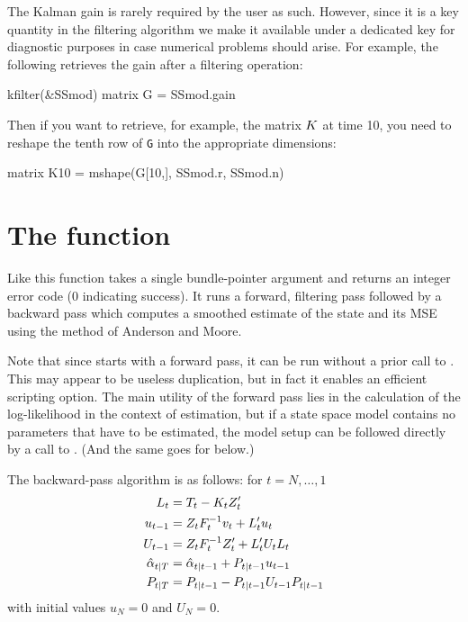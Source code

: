 The Kalman gain is rarely required by the user as such. However, since
it is a key quantity in the filtering algorithm we make it available
under a dedicated key for diagnostic purposes in case numerical
problems should arise. For example, the following retrieves the gain
after a filtering operation:
%
\begin{code}
kfilter(&SSmod)
matrix G = SSmod.gain
\end{code}

Then if you want to retrieve, for example, the matrix $K$ at time
10, you need to reshape the tenth row of \texttt{G} into the
appropriate dimensions:
\begin{code}
matrix K10 = mshape(G[10,], SSmod.r, SSmod.n)
\end{code}

\section{The  function}
\label{sec:ksmooth}

Like  this function takes a single bundle-pointer
argument and returns an integer error code (0 indicating success).  It
runs a forward, filtering pass followed by a backward pass which
computes a smoothed estimate of the state and its MSE using the method
of Anderson and Moore.

Note that since  starts with a forward pass, it can be
run without a prior call to . This may appear to be
useless duplication, but in fact it enables an efficient scripting
option.  The main utility of the forward pass lies in the calculation
of the log-likelihood in the context of estimation, but if a state
space model contains no parameters that have to be estimated, the
model setup can be followed directly by a call to . (And
the same goes for  below.)

The backward-pass algorithm is as follows: for $t=N,\dots,1$
%
\begin{align*}
L_t &= T_t - K_t Z_t' \\
u_{t-1} &= Z_t F_t^{-1} v_t
 + L_t' u_t \\
U_{t-1} &= Z_t F_t^{-1} Z_t' +
  L_t' U_t L_t \\
\hat{\alpha}_{t|T} &= \hat{\alpha}_{t|t-1} +
  P_{t|t-1} u_{t-1} \\
P_{t|T} &= P_{t|t-1} -
  P_{t|t-1} U_{t-1} P_{t|t-1}
\end{align*}
%
with initial values $u_N = 0$ and $U_N = 0$.

